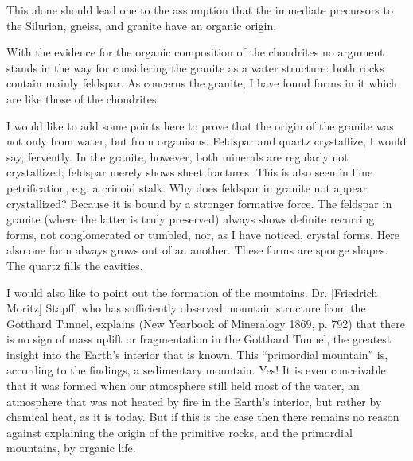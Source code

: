 \documentclass[a4paper, 12pt, oneside]{article}
\begin{document}
This alone should lead one to the assumption that the immediate precursors to the Silurian, gneiss, and granite have an organic origin.

With the evidence for the organic composition of the chondrites no argument stands in the way for considering the granite as a water structure: both rocks contain mainly feldspar. As concerns the granite, I have found forms in it which are like those of the chondrites.

I would like to add some points here to prove that the origin of the granite was not only from water, but from organisms. Feldspar and quartz crystallize, I would say, fervently. In the granite, however, both minerals are regularly not crystallized; feldspar merely shows sheet fractures. This is also seen in lime petrification, e.g. a crinoid stalk. Why does feldspar in granite not appear crystallized? Because it is bound by a stronger formative force. The feldspar in granite (where the latter is truly preserved) always shows definite recurring forms, not conglomerated or tumbled, nor, as I have noticed, crystal forms. Here also one form always grows out of an another. These forms are sponge shapes. The quartz fills the cavities.

I would also like to point out the formation of the mountains. Dr. [Friedrich Moritz] Stapff, who has sufficiently observed mountain structure from the Gotthard Tunnel, explains (New Yearbook of Mineralogy 1869, p. 792) that there is no sign of mass uplift or fragmentation in the Gotthard Tunnel, the greatest insight into the Earth's interior that is known. This ``primordial mountain'' is, according to the findings, a sedimentary mountain. Yes! It is even conceivable that it was formed when our atmosphere still held most of the water, an atmosphere that was not heated by fire in the Earth's interior, but rather by chemical heat, as it is today. But if this is the case then there remains no reason against explaining the origin of the primitive rocks, and the primordial mountains, by organic life.
\end{document}
